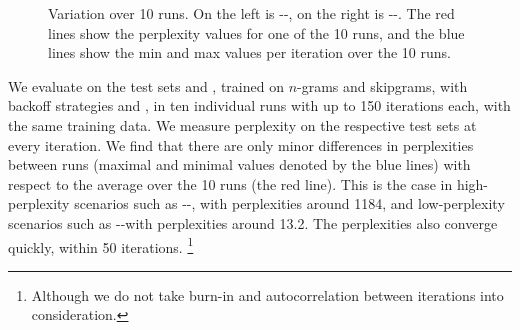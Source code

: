 \begin{figure*}
\caption{Variation over 10 runs. On the left is \jrc-\obw-\BOF, on the right is \jrc-\jrc-\BON. The red lines show the perplexity values for one of the 10 runs, and the blue lines show the min and max values per iteration over the 10 runs.}\label{fig:iterplots}
\end{figure*}


We evaluate on the test sets \jrc and \obw, trained on $n$-grams and skipgrams, with backoff strategies \BON and \BOF, in ten individual runs with up to 150 iterations each, with the same training data. We measure perplexity on the respective test sets at every iteration. We find that there are only minor differences in perplexities between runs (maximal and minimal values denoted by the blue lines) with respect to the average over the 10 runs (the red line). This is the case in high-perplexity scenarios such as \jrc-\obw-\BOF, with perplexities around 1184, and low-perplexity scenarios such as \jrc-\jrc-\BOF with perplexities around 13.2. The perplexities also converge quickly, within 50 iterations.
\footnote{Although we do not take burn-in and autocorrelation between iterations into consideration.}

